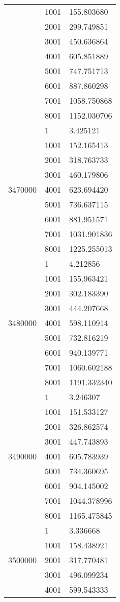 \begin{table}[htb!]
\begin{tabular}{lll}
 & 1001 & 155.803680 \\
 & 2001 & 299.749851 \\
 & 3001 & 450.636864 \\
 & 4001 & 605.851889 \\
 & 5001 & 747.751713 \\
 & 6001 & 887.860298 \\
 & 7001 & 1058.750868 \\
 & 8001 & 1152.030706 \\
\multirow[c]{9}{*}{3470000} & 1 & 3.425121 \\
 & 1001 & 152.165413 \\
 & 2001 & 318.763733 \\
 & 3001 & 460.179806 \\
 & 4001 & 623.694420 \\
 & 5001 & 736.637115 \\
 & 6001 & 881.951571 \\
 & 7001 & 1031.901836 \\
 & 8001 & 1225.255013 \\
\multirow[c]{9}{*}{3480000} & 1 & 4.212856 \\
 & 1001 & 155.963421 \\
 & 2001 & 302.183390 \\
 & 3001 & 444.207668 \\
 & 4001 & 598.110914 \\
 & 5001 & 732.816219 \\
 & 6001 & 940.139771 \\
 & 7001 & 1060.602188 \\
 & 8001 & 1191.332340 \\
\multirow[c]{9}{*}{3490000} & 1 & 3.246307 \\
 & 1001 & 151.533127 \\
 & 2001 & 326.862574 \\
 & 3001 & 447.743893 \\
 & 4001 & 605.783939 \\
 & 5001 & 734.360695 \\
 & 6001 & 904.145002 \\
 & 7001 & 1044.378996 \\
 & 8001 & 1165.475845 \\
\multirow[c]{9}{*}{3500000} & 1 & 3.336668 \\
 & 1001 & 158.438921 \\
 & 2001 & 317.770481 \\
 & 3001 & 496.099234 \\
 & 4001 & 599.543333 \\

\end{tabular}
\end{table}
